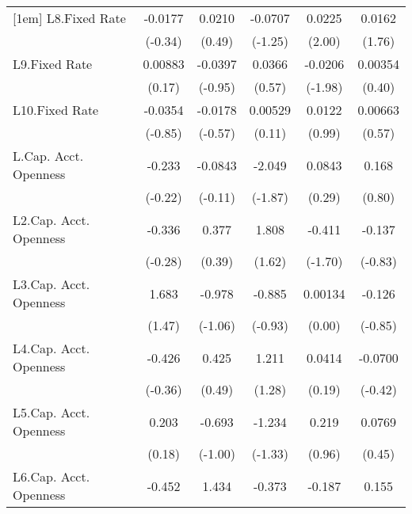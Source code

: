 {\begin{longtable}{l*{5}{c}}
[1em]
L8.Fixed Rate   &  -0.0177         &   0.0210         &  -0.0707         &   0.0225\sym{*}  &   0.0162         \\
                &  (-0.34)         &   (0.49)         &  (-1.25)         &   (2.00)         &   (1.76)         \\
[1em]
L9.Fixed Rate   &  0.00883         &  -0.0397         &   0.0366         &  -0.0206\sym{*}  &  0.00354         \\
                &   (0.17)         &  (-0.95)         &   (0.57)         &  (-1.98)         &   (0.40)         \\
[1em]
L10.Fixed Rate  &  -0.0354         &  -0.0178         &  0.00529         &   0.0122         &  0.00663         \\
                &  (-0.85)         &  (-0.57)         &   (0.11)         &   (0.99)         &   (0.57)         \\
[1em]
L.Cap. Acct. Openness&   -0.233         &  -0.0843         &   -2.049         &   0.0843         &    0.168         \\
                &  (-0.22)         &  (-0.11)         &  (-1.87)         &   (0.29)         &   (0.80)         \\
[1em]
L2.Cap. Acct. Openness&   -0.336         &    0.377         &    1.808         &   -0.411         &   -0.137         \\
                &  (-0.28)         &   (0.39)         &   (1.62)         &  (-1.70)         &  (-0.83)         \\
[1em]
L3.Cap. Acct. Openness&    1.683         &   -0.978         &   -0.885         &  0.00134         &   -0.126         \\
                &   (1.47)         &  (-1.06)         &  (-0.93)         &   (0.00)         &  (-0.85)         \\
[1em]
L4.Cap. Acct. Openness&   -0.426         &    0.425         &    1.211         &   0.0414         &  -0.0700         \\
                &  (-0.36)         &   (0.49)         &   (1.28)         &   (0.19)         &  (-0.42)         \\
[1em]
L5.Cap. Acct. Openness&    0.203         &   -0.693         &   -1.234         &    0.219         &   0.0769         \\
                &   (0.18)         &  (-1.00)         &  (-1.33)         &   (0.96)         &   (0.45)         \\
[1em]
L6.Cap. Acct. Openness&   -0.452         &    1.434         &   -0.373         &   -0.187         &    0.155         \\

\end{longtable}}
